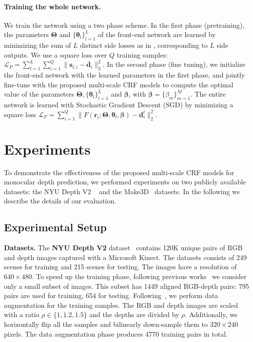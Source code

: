 \documentclass[10pt,twocolumn,letterpaper]{article}
\newcommand{\vect}[1]{\mathbf{#1}}
\begin{document}
\paragraph{Training the whole network.}\label{learning}
We train the network using a two phase scheme. In the first phase (pretraining), the 
parameters $\mathbf{\Theta}$ and $\{\boldsymbol{\theta}_l\}_{l=1}^L$ 
of the front-end network are learned
by minimizing the sum of $L$ distinct side losses as in \cite{xie2015holistically}, corresponding to $L$ side 
outputs. We use a square loss over $Q$ training samples: $\mathcal{L}_P=\sum_{l=1}^L  \sum_{i=1}^{Q}\|\vect{s}_{l,i} - \bar{\vect{d}}_i\|_2^2$. In the second phase (fine tuning), we initialize the front-end network with the learned parameters in the first phase, and 
jointly fine-tune with the proposed multi-scale CRF models to compute the optimal value of the 
parameters $\mathbf{\Theta}, \{\boldsymbol{\theta}_l\}_{l=1}^L$ and $\boldsymbol{\beta}$, with 
$\boldsymbol{\beta}=\{\beta_m\}_{m=1}^M$. The entire network is learned with Stochastic Gradient Descent (SGD) 
by minimizing a square loss $\mathcal{L}_F=\sum_{i=1}^{Q}\|F(\vect{r}_i; \mathbf{\Theta},\boldsymbol{\theta}_l,\boldsymbol{\beta}) - \vect{d}_i^l\|_2^2$.  

 
\section{Experiments}
To demonstrate the effectiveness of the proposed multi-scale CRF models for monocular depth prediction,
we performed experiments on two publicly available datasets: 
the NYU Depth V2 ~\cite{silberman2012indoor} and the Make3D~\cite{saxena2005learning} datasets. In the
following we describe the details of our evaluation.
\subsection{Experimental Setup}
\label{setup}
\textbf{Datasets.} The \textbf{NYU Depth V2} dataset~\cite{silberman2012indoor} contains 120K unique pairs of RGB and depth images captured with a 
Microsoft Kinect. The datasets consists of 249 scenes for training and 215 scenes for testing. The images
have a resolution of $640 \times 480$. To speed up the training phase, following previous works~\cite{liu2015deep,zhuo2015indoor}
we consider only a small subset of images. This subset has 1449 aligned RGB-depth pairs:
795 pairs are used for training, 654 for testing. Following~\cite{eigen2014depth}, we perform data augmentation for 
the training samples. The RGB and depth images are scaled with a ratio $\rho \in \{1, 1.2, 1.5\}$ and the depths are divided by $\rho$. Additionally,
we horizontally flip all the samples and bilinearly down-sample them to $320 \times 240$ pixels. The data augmentation phase produces 
4770 training pairs in total. 
\end{document}
